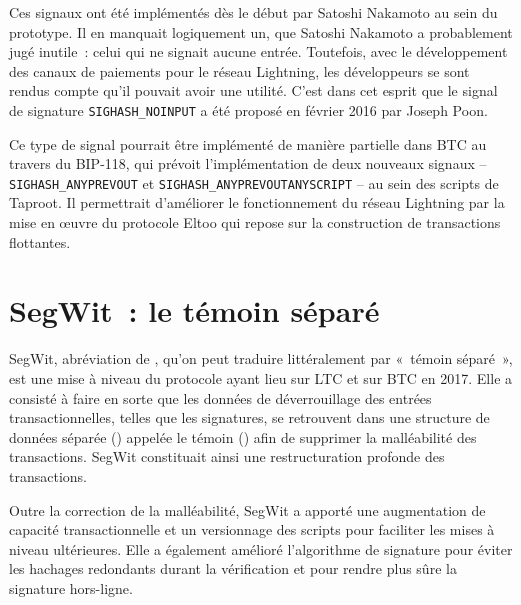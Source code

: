 
Ces signaux ont été implémentés dès le début par Satoshi Nakamoto au sein du prototype. Il en manquait logiquement un, que Satoshi Nakamoto a probablement jugé inutile~: celui qui ne signait aucune entrée. Toutefois, avec le développement des canaux de paiements pour le réseau Lightning, les développeurs se sont rendus compte qu'il pouvait avoir une utilité. C'est dans cet esprit que le signal de signature \texttt{SIGHASH\_NOINPUT} a été proposé en février 2016 par Joseph Poon.

Ce type de signal pourrait être implémenté de manière partielle dans BTC au travers du BIP-118, qui prévoit l'implémentation de deux nouveaux signaux -- \texttt{SIGHASH\_ANYPREVOUT} et \texttt{SIGHASH\_ANYPREVOUTANYSCRIPT} -- au sein des scripts de Taproot. Il permettrait d'améliorer le fonctionnement du réseau Lightning par la mise en œuvre du protocole Eltoo qui repose sur la construction de transactions flottantes.

\section*{SegWit~: le témoin séparé}

SegWit, abréviation de , qu'on peut traduire littéralement par «~témoin séparé~», est une mise à niveau du protocole ayant lieu sur LTC et sur BTC en 2017. Elle a consisté à faire en sorte que les données de déverrouillage des entrées transactionnelles, telles que les signatures, se retrouvent dans une structure de données séparée () appelée le témoin () afin de supprimer la malléabilité des transactions. SegWit constituait ainsi une restructuration profonde des transactions.

Outre la correction de la malléabilité, SegWit a apporté une augmentation de capacité transactionnelle et un versionnage des scripts pour faciliter les mises à niveau ultérieures. Elle a également amélioré l'algorithme de signature pour éviter les hachages redondants durant la vérification et pour rendre plus sûre la signature hors-ligne.

